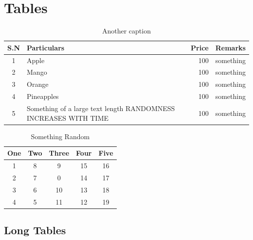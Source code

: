 \documentclass[12pt]{report} %
\begin{document}
\chapter{Tables}
\begin{table}[htb]
\centering
\caption{Random Table}
\renewcommand{\arraystretch}{2.5} %
\begin{tabular}{|c|p{6cm}|r|l|} %
    \hline
    S.N & Particulars & Price & Remarks \\ \hline %
    1 &  Apple & 100 & something \\ \hline
    2 &  Mango & 100 & something \\ \hline
    3 &  Orange & 100 & something \\ \hline
    4 &  Pineapples & 100 & something \\ \hline
    5 &  Something of a large text length RANDOMNESS INCREASES WITH TIME& 100 & something \\ \hline
\end{tabular}
\caption{Another caption}
\end{table}


\begin{table}
    \centering
    \begin{tabular}{|c|c|c|c|c|}
    \hline
         One & Two  & Three & Four & Five\\\hline
         1&  8&  9&  15& 16\\
         2&  7&  0&  14& 17\\
         3&  6&  10&  13& 18\\
         4&  5&  11&  12& 19\\\hline
    \end{tabular}
    \caption{Something Random}
    \label{tab:placeholder}
\end{table}

\section{Long Tables}
\end{document}
